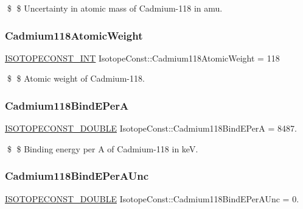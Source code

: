 \$ \$ Uncertainty in atomic mass of Cadmium-\/118 in amu. \mbox{\label{group___isotope_const-_cadmium-_cd118_ga8fe91adae899cd13400ec469ad4dad66}} 
\subsubsection{\texorpdfstring{Cadmium118\+Atomic\+Weight}{Cadmium118AtomicWeight}}
{\footnotesize\ttfamily \mbox{\hyperlink{group___isotope_const-_macros_ga5f18360b3e99483a35c32d789e62621c}{I\+S\+O\+T\+O\+P\+E\+C\+O\+N\+S\+T\+\_\+\+I\+NT}} Isotope\+Const\+::\+Cadmium118\+Atomic\+Weight = 118}

\$ \$ Atomic weight of Cadmium-\/118. \mbox{\label{group___isotope_const-_cadmium-_cd118_ga040b2bf7c51d0b57a084d385696cfe2a}} 
\subsubsection{\texorpdfstring{Cadmium118\+Bind\+E\+PerA}{Cadmium118BindEPerA}}
{\footnotesize\ttfamily \mbox{\hyperlink{group___isotope_const-_macros_ga8f45a7272ce02c0b4c65c44636ed719a}{I\+S\+O\+T\+O\+P\+E\+C\+O\+N\+S\+T\+\_\+\+D\+O\+U\+B\+LE}} Isotope\+Const\+::\+Cadmium118\+Bind\+E\+PerA = 8487.}

\$ \$ Binding energy per A of Cadmium-\/118 in keV. \mbox{\label{group___isotope_const-_cadmium-_cd118_ga0ff80ce45fec83a9952e9ca76474f71d}} 
\subsubsection{\texorpdfstring{Cadmium118\+Bind\+E\+Per\+A\+Unc}{Cadmium118BindEPerAUnc}}
{\footnotesize\ttfamily \mbox{\hyperlink{group___isotope_const-_macros_ga8f45a7272ce02c0b4c65c44636ed719a}{I\+S\+O\+T\+O\+P\+E\+C\+O\+N\+S\+T\+\_\+\+D\+O\+U\+B\+LE}} Isotope\+Const\+::\+Cadmium118\+Bind\+E\+Per\+A\+Unc = 0.}

